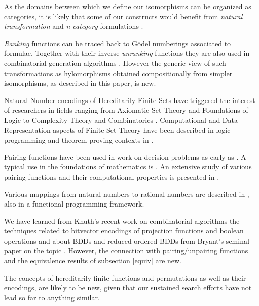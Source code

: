 \documentclass[]{INCLUDES/llncs}
\begin{document}
As the domains between which we define our
isomorphisms can be organized as categories,
it is likely that some of our constructs would benefit
from {\em natural transformation} \cite{matcat} and {\em n-category}
formulations \cite{Baez97anintroduction}. 

{\em Ranking} functions can be traced back to G\"{o}del numberings
\cite{Goedel:31,conf/icalp/HartmanisB74} associated to formulae. 
Together with their inverse {\em unranking} functions they are also 
used in combinatorial generation
algorithms
\cite{conf/mfcs/MartinezM03,knuth06draft,Ruskey90generatingbinary,Myrvold01rankingand}.
However the generic view of such transformations as hylomorphisms obtained compositionally
from simpler isomorphisms, as described in this paper,
is new.

Natural Number encodings of Hereditarily Finite Sets have 
triggered the interest of researchers in fields ranging from 
Axiomatic Set Theory and Foundations of Logic to 
Complexity Theory and Combinatorics
\cite{finitemath,kaye07,abian78,avigad97,DBLP:journals/mlq/Kirby07,DBLP:conf/foiks/LeontjevS00}.
Computational and Data Representation aspects of Finite Set Theory 
have been described in logic programming and theorem proving contexts 
in \cite{DBLP:journals/tplp/PiazzaP04,DBLP:conf/types/Paulson94}. 

Pairing functions have been used in work on decision problems as early as
\cite{robinson50,robinsons68b}. A
typical use in the foundations of mathematics is
\cite{DBLP:journals/tcs/CegielskiR01}.
An extensive study of various pairing functions and their 
computational properties is presented in 
\cite{DBLP:conf/ipps/Rosenberg02a}.

Various mappings from natural numbers to rational numbers are described 
in \cite{rationals}, also in a functional programming framework.

We have learned from Knuth's recent work on combinatorial
algorithms \cite{knuth06draft} the techniques related to
bitvector encodings of projection functions and boolean operations
and about BDDs and reduced ordered BDDs from Bryant's
seminal paper on the topic \cite{bryant86graphbased}.
However, the connection with pairing/unpairing functions
and the equivalence results of subsection \ref{equiv} are new.

The concepts of hereditarily finite functions and
permutations as well as their encodings, are
likely to be new, given that our sustained 
search efforts have not lead so far to anything
similar. 
\end{document}
